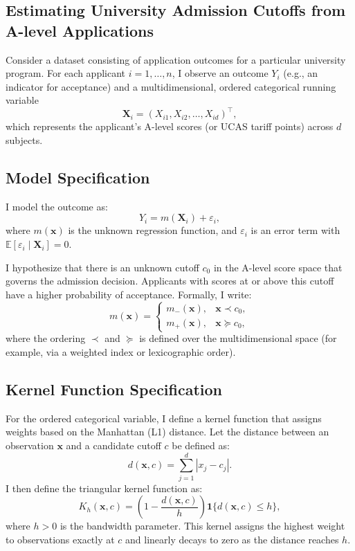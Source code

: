 \subsection{Estimating University Admission Cutoffs from A-level Applications}

Consider a dataset consisting of application outcomes for a particular university program. For each applicant \(i=1,\ldots,n\), I observe an outcome \(Y_i\) (e.g., an indicator for acceptance) and a multidimensional, ordered categorical running variable 
\[
\bm{X}_i = (X_{i1}, X_{i2}, \dots, X_{id})^\top,
\]
which represents the applicant's A-level scores (or UCAS tariff points) across \(d\) subjects.

\subsection*{Model Specification}

I model the outcome as:
\begin{equation} \label{eq:model}
Y_i = m(\bm{X}_i) + \varepsilon_i,
\end{equation}
where \( m(\bm{x}) \) is the unknown regression function, and \(\varepsilon_i\) is an error term with \(\mathbb{E}[\varepsilon_i \mid \bm{X}_i]=0\).

I hypothesize that there is an unknown cutoff \( c_0 \) in the A-level score space that governs the admission decision. Applicants with scores at or above this cutoff have a higher probability of acceptance. Formally, I write:
\[
m(\bm{x}) = 
\begin{cases}
m_-(\bm{x}), & \bm{x} \prec c_0,\\[1ex]
m_+(\bm{x}), & \bm{x} \succeq c_0,
\end{cases}
\]
where the ordering \( \prec \) and \( \succeq \) is defined over the multidimensional space (for example, via a weighted index or lexicographic order).

\subsection*{Kernel Function Specification}

For the ordered categorical variable, I define a kernel function that assigns weights based on the Manhattan (L1) distance. Let the distance between an observation \(\bm{x}\) and a candidate cutoff \( c \) be defined as:
\begin{equation}
d(\bm{x}, c) = \sum_{j=1}^d |x_j - c_j|.
\end{equation}
I then define the triangular kernel function as:
\begin{equation} \label{eq:kernel}
K_h(\bm{x}, c) = \left( 1 - \frac{d(\bm{x}, c)}{h} \right) \mathbf{1}\{ d(\bm{x}, c) \leq h \},
\end{equation}
where \( h > 0 \) is the bandwidth parameter. This kernel assigns the highest weight to observations exactly at \( c \) and linearly decays to zero as the distance reaches \( h \).

